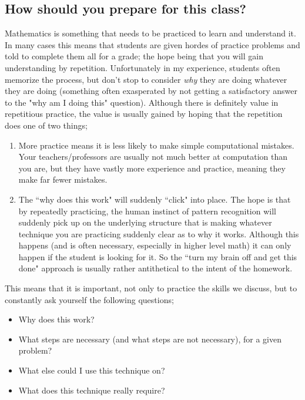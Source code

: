 
\subsection{How should you prepare for this class?}
Mathematics is something that needs to be practiced to learn and understand it. In many cases this means that students are given hordes of practice problems and told to complete them all for a grade; the hope being that you will gain understanding by repetition. Unfortunately in my experience, students often memorize the process, but don't stop to consider \textit{why} they are doing whatever they are doing (something often exasperated by not getting a satisfactory answer to the "why am I doing this" question). Although there is definitely value in repetitious practice, the value is usually gained by hoping that the repetition does one of two things;
\begin{enumerate}
\item More practice means it is less likely to make simple computational mistakes. Your teachers/professors are usually not much better at computation than you are, but they have vastly more experience and practice, meaning they make far fewer mistakes.
\item The ``why does this work" will suddenly ``click" into place. The hope is that by repeatedly practicing, the human instinct of pattern recognition will suddenly pick up on the underlying structure that is making whatever technique you are practicing suddenly clear as to why it works. Although this happens (and is often necessary, especially in higher level math) it can only happen if the student is looking for it. So the ``turn my brain off and get this done" approach is usually rather antithetical to the intent of the homework.
\end{enumerate}

This means that it is important, not only to practice the skills we discuss, but to constantly ask yourself the following questions;
\begin{itemize}
\item Why does this work?
\item What steps are necessary (and what steps are not necessary), for a given problem?
\item What else could I use this technique on? 
\item What does this technique really require?
\end{itemize}

